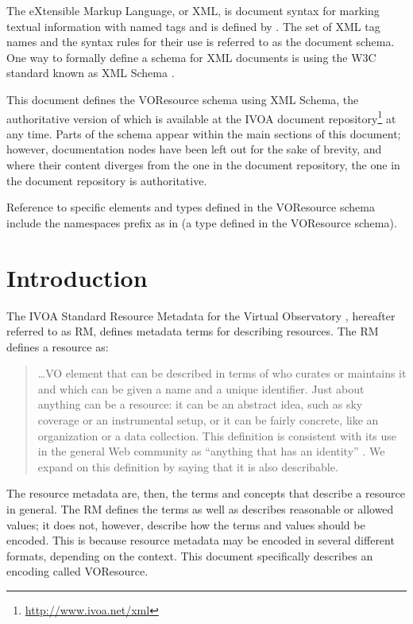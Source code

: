 \documentclass[11pt,a4paper]{ivoa}
\begin{document}
The eXtensible Markup Language, or XML, is document syntax for marking
textual information with named tags and is defined by \citet{std:XML}.
The set of XML tag names and the syntax
rules for their use is referred to as the document schema.  One way to
formally define a schema for XML documents is using the W3C standard
known as XML Schema \citep{std:XSD}.

This document defines the VOResource schema using XML Schema, the
authoritative version of which is available at the IVOA document
repository\footnote{\url{http://www.ivoa.net/xml}} at any time.
Parts of the schema appear within the main sections of this document;
however, documentation nodes have been left out for the sake of brevity,
and where their content diverges from the one in the document
repository, the one in the document repository is authoritative.

Reference to specific elements and types defined in the VOResource
schema include the namespaces prefix  as in
 (a type defined in the VOResource schema).

\section{Introduction}

The IVOA Standard Resource Metadata for the Virtual Observatory
\citep{2007ivoa.spec.0302H}, hereafter referred to as RM, defines
metadata terms for describing resources.  The RM defines a resource as: 

\begin{quotation}
\dots VO element that can be described in terms of who curates or
maintains it and which can be given a name and a unique identifier.
Just about anything can be a resource: it can be an abstract idea,
such as sky coverage or an instrumental setup, or it can be fairly
concrete, like an organization or a data collection.  This definition
is consistent with its use in the general Web community as
``anything that has an identity'' \citep{std:RFC3986}.  We
expand on this definition by saying that it is also describable.  
\end{quotation}

The resource metadata are, then, the terms and concepts that describe
a resource in general.  The RM defines the terms as well as describes
reasonable or allowed values; it does not, however, describe how the
terms and values should be encoded.  This is because resource metadata
may be encoded in several different formats, depending on the
context.  This document specifically describes an encoding called
VOResource.  
\end{document}
